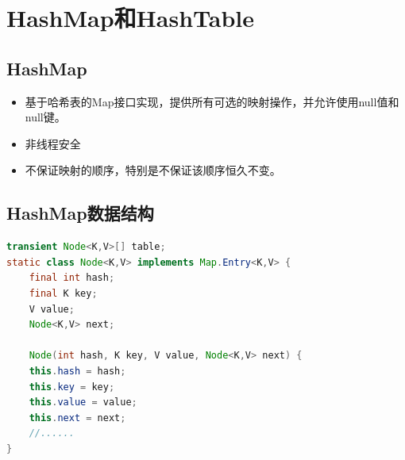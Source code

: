 \section{HashMap和HashTable}
\subsection{HashMap}
\begin{itemize}
	\item 基于哈希表的Map接口实现，提供所有可选的映射操作，并允许使用null值和null键。
	\item 非线程安全
	\item 不保证映射的顺序，特别是不保证该顺序恒久不变。
\end{itemize}
\subsection{HashMap数据结构}
\begin{lstlisting}[language=java]
transient Node<K,V>[] table;
static class Node<K,V> implements Map.Entry<K,V> {
	final int hash;
	final K key;
	V value;
	Node<K,V> next;
	
	Node(int hash, K key, V value, Node<K,V> next) {
	this.hash = hash;
	this.key = key;
	this.value = value;
	this.next = next;
	//......
}
\end{lstlisting}
